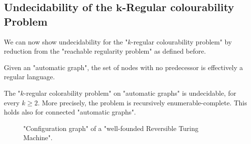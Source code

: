 \subsection[Undecidability of the $k$-Regular colourability Problem]{Undecidability of the $\boldsymbol{k}$-Regular colourability Problem}
We can now show undecidability for the "$k$-regular colourability problem" by reduction from the "reachable regularity problem" as defined before.

\begin{fact}
    \AP\label{fact:initial-nodes-are-regular}
    Given an "automatic graph", the set of nodes with no predecessor is effectively a regular language. 
\end{fact}

\begin{theorem}
    \AP\label{thm:k-reg-col-undec}
    The {\sc"$k$-regular colorability problem"} on "automatic graphs" is undecidable, for every $k\geq 2$. More precisely, the problem is recursively enumerable-complete. This holds also for connected "automatic graphs".
\end{theorem}

\begin{figure}
	\centering
	\begin{tikzpicture}
		
	\end{tikzpicture}
	\caption{
		\AP\label{fig:config-graph-wf-RTM}
		"Configuration graph" of a "well-founded Reversible Turing Machine".
	}
\end{figure}

